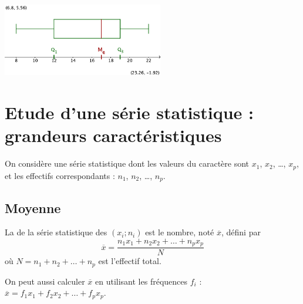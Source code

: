 \begin{center}
  \includegraphics[width=7cm]{Stats_Fig4_DiagBoite}  
\end{center}



\section{Etude d'une série statistique : grandeurs caractéristiques}

On considère une série statistique dont les valeurs du caractère sont
$x_1$, $x_2$, {\ldots}, $x_p$, et les effectifs correspondants :
$n_1$, $n_2$, {\ldots}, $n_p$.


\subsection{Moyenne}

\begin{definition}
    La  de la série statistique des $(x_i;n_i)$ est le
  nombre, noté $\overline{x}$, défini par
  \[
  \overline{x} =
  \frac{n_1x_1+n_2x_2+{\ldots}+n_px_p}{N} 
  \]
  où $N = n_1+n_2+{\ldots}+n_p$ est l'effectif total.

    
\end{definition}

\bigskip


\medskip

\begin{remark}
On peut aussi calculer $\overline{x}$ en utilisant les fréquences
  $f_i$ : \\[1ex]
  $ \overline{x} = f_1 x_1 + f_2x_2+{\ldots}+f_px_p $. 

    
\end{remark}

